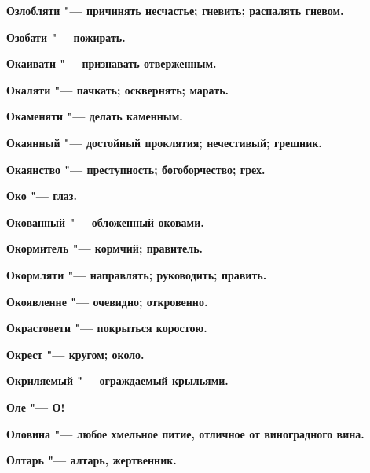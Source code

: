 \begin{multicols}{2}
\bfseries Озлобляти\normalfont{} "--- причинять несчастье; гневить; распалять гневом. 




\bfseries Озобати\normalfont{} "--- пожирать. 




\bfseries Окаивати\normalfont{} "--- признавать отверженным. 




\bfseries Окаляти\normalfont{} "--- пачкать; осквернять; марать. 




\bfseries Окаменяти\normalfont{} "--- делать каменным. 




\bfseries Окаянный\normalfont{} "--- достойный проклятия; нечестивый; грешник. 




\bfseries Окаянство\normalfont{} "--- преступность; богоборчество; грех. 




\bfseries Око\normalfont{} "--- глаз. 




\bfseries Окованный\normalfont{} "--- обложенный оковами. 




\bfseries Окормитель\normalfont{} "--- кормчий; правитель. 




\bfseries Окормляти\normalfont{} "--- направлять; руководить; править. 




\bfseries Окоявленне\normalfont{} "--- очевидно; откровенно. 




\bfseries Окрастовети\normalfont{} "--- покрыться коростою. 




\bfseries Окрест\normalfont{} "--- кругом; около. 




\bfseries Окриляемый\normalfont{} "--- ограждаемый крыльями. 




\bfseries Оле\normalfont{} "--- О! 




\bfseries Оловина\normalfont{} "--- любое хмельное питие, отличное от виноградного вина. 




\bfseries Олтарь\normalfont{} "--- алтарь, жертвенник. 





\end{multicols}
